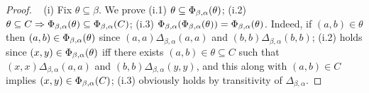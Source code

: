 \begin{proof}\
\noindent (i) Fix $\theta \subseteq \beta$. We prove
    (i.1) $\theta \subseteq \Phi_{\beta, \alpha}(\theta)$;     
    (i.2) $\theta \subseteq C  \Rightarrow \Phi_{\beta, \alpha}(\theta) \subseteq \Phi_{\beta, \alpha}(C)$;    
    (i.3) $\Phi_{\beta, \alpha}(\Phi_{\beta, \alpha}(\theta))  = \Phi_{\beta, \alpha}(\theta)$. Indeed,
    if $(a,b) \in \theta$ then $(a,b) \in \Phi_{\beta, \alpha}(\theta)$ since 
    $(a,a)\mathrel{\Delta_{\beta, \alpha}} (a,a)$ and 
    $(b,b)\mathrel{\Delta_{\beta, \alpha}} (b,b)$;
    (i.2) holds since $(x,y) \in \Phi_{\beta, \alpha}(\theta)$ iff there exists
    $(a,b) \in \theta \subseteq C$ such that
    $(x,x) \mathrel{\Delta_{\beta, \alpha}} (a,a)$
    and $(b,b) \mathrel{\Delta_{\beta, \alpha}} (y,y)$, and this along with
    $(a,b)\in C$ implies $(x,y) \in \Phi_{\beta, \alpha}(C)$;
    (i.3) obviously holds by
    transitivity of $\Delta_{\beta, \alpha}$.
    \bigskip


\end{proof}
